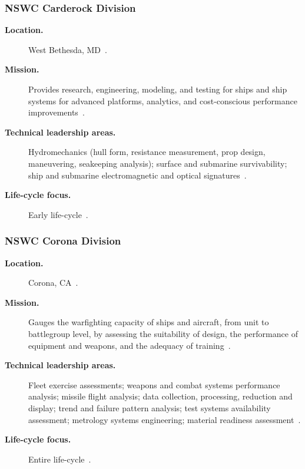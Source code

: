 \documentclass[../main.tex]{subfiles}
\begin{document}
\subsubsection{NSWC Carderock Division}
\begin{description}
  \item[\textbf{Location.}] West Bethesda, MD~\autocite{edo-2-1-4-warfare-centers-2024}.
  \item[\textbf{Mission.}] Provides research, engineering, modeling, and testing for ships and ship systems for advanced platforms, analytics, and cost-conscious performance improvements~\autocite{edo-2-1-4-warfare-centers-2024}.
  \item[\textbf{Technical leadership areas.}] Hydromechanics (hull form, resistance measurement, prop design, maneuvering, seakeeping analysis); surface and submarine survivability; ship and submarine electromagnetic and optical signatures~\autocite{edo-2-1-4-warfare-centers-2024}.
  \item[\textbf{Life-cycle focus.}] Early life-cycle~\autocite{edo-2-1-4-warfare-centers-2024}.
\end{description}

\subsubsection{NSWC Corona Division}
\begin{description}
  \item[\textbf{Location.}] Corona, CA~\autocite{edo-2-1-4-warfare-centers-2024}.
  \item[\textbf{Mission.}] Gauges the warfighting capacity of ships and aircraft, from unit to battlegroup level, by assessing the suitability of design, the performance of equipment and weapons, and the adequacy of training~\autocite{edo-2-1-4-warfare-centers-2024}.
  \item[\textbf{Technical leadership areas.}] Fleet exercise assessments; weapons and combat systems performance analysis; missile flight analysis; data collection, processing, reduction and display; trend and failure pattern analysis; test systems availability assessment; metrology systems engineering; material readiness assessment~\autocite{edo-2-1-4-warfare-centers-2024}.
  \item[\textbf{Life-cycle focus.}] Entire life-cycle~\autocite{edo-2-1-4-warfare-centers-2024}.
\end{description}
\end{document}
